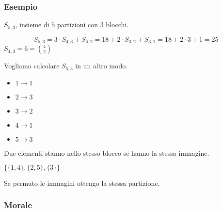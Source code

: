 \documentclass[11pt]{article}
\begin{document}
		\subsubsection{Esempio}

		$S_{5,3}$, insieme di $5$ partizioni con $3$ blocchi.
		
		\[
		S_{5,3} = 3 \cdot S_{4,3} + S_{4,2} = 18 + 2 \cdot S_{3,2} + S_{3,1}
		= 18 + 2 \cdot 3 + 1 = 25
		\]
		$S_{4,3} = 6 = \binom{4}{2}$

		Vogliamo calcolare $S_{5,3}$ in un altro modo.

		\begin{itemize}
			\item $1 \to 1$
			\item $2 \to 3$
			\item $3 \to 2$
			\item $4 \to 1$
			\item $5 \to 3$
		\end{itemize}

		Due elementi stanno nello stesso blocco se hanno la stessa immagine.

		$\{\{1,4\},\{2,5\},\{3\}\}$

		Se permuto le immagini ottengo la stessa partizione.

		\subsubsection{Morale}

\end{document}
